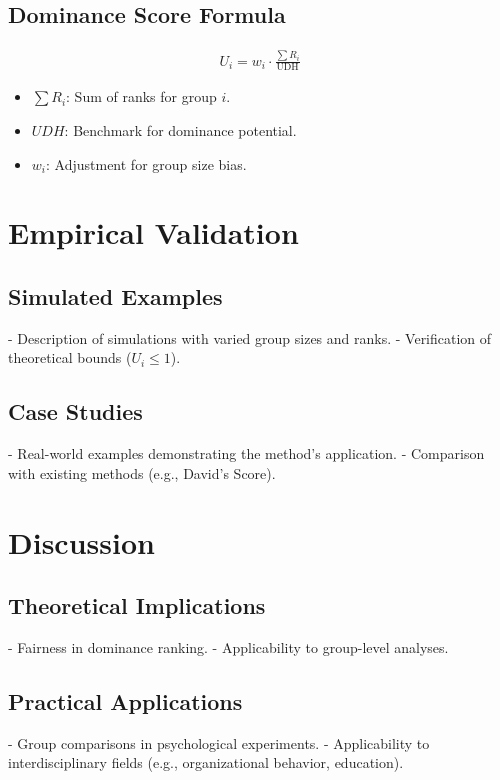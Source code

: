 \documentclass[12pt]{article}
\begin{document}
		\subsection{Dominance Score Formula}
		\begin{align}
			U_i = w_i \cdot \frac{\sum R_i}{\text{UDH}}
		\end{align}
		\begin{itemize}
			\item $\sum R_i$: Sum of ranks for group $i$.
			\item $UDH$: Benchmark for dominance potential.
			\item $w_i$: Adjustment for group size bias.
		\end{itemize}
		
		\section{Empirical Validation}
		\subsection{Simulated Examples}
		- Description of simulations with varied group sizes and ranks.
		- Verification of theoretical bounds ($U_i \leq 1$).
		
		\subsection{Case Studies}
		- Real-world examples demonstrating the method's application.
		- Comparison with existing methods (e.g., David's Score).
		
		\section{Discussion}
		\subsection{Theoretical Implications}
		- Fairness in dominance ranking.
		- Applicability to group-level analyses.
		
		\subsection{Practical Applications}
		- Group comparisons in psychological experiments.
		- Applicability to interdisciplinary fields (e.g., organizational behavior, education).
		
\end{document}
